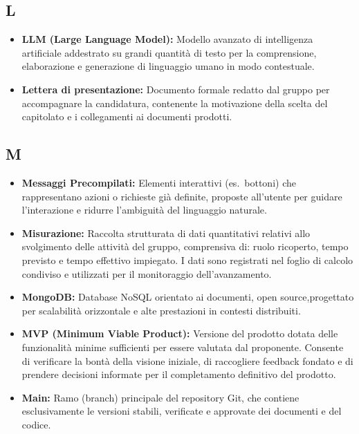 {}
\subsection*{L}
\begin{itemize}[leftmargin=*]
    \item \textbf{LLM (Large Language Model):} Modello avanzato di intelligenza
          artificiale addestrato su grandi quantità di testo per la comprensione,
          elaborazione e generazione di linguaggio umano in modo contestuale.
      \item \textbf{Lettera di presentazione:} Documento formale redatto dal gruppo per accompagnare la candidatura, contenente la motivazione della scelta del capitolato e i collegamenti ai documenti prodotti.
\end{itemize}
 
{}
\subsection*{M}
\begin{itemize}[leftmargin=*]
      \item \textbf{Messaggi Precompilati:} Elementi interattivi (es.\ bottoni) che rappresentano azioni o richieste già definite, proposte all'utente per guidare l'interazione e ridurre l'ambiguità del linguaggio naturale.
      \item \textbf{Misurazione:} Raccolta strutturata di dati quantitativi relativi
          allo svolgimento delle attività del gruppo, comprensiva di: ruolo
          ricoperto, tempo previsto e tempo effettivo impiegato. I dati sono
          registrati nel foglio di calcolo condiviso e utilizzati per il
          monitoraggio dell'avanzamento.
      \item \textbf{MongoDB:} Database NoSQL orientato ai documenti, open source,progettato per scalabilità orizzontale e alte prestazioni in contesti distribuiti.
      \item \textbf{MVP (Minimum Viable Product):} Versione del prodotto dotata delle
          funzionalità minime sufficienti per essere valutata dal proponente.
          Consente di verificare la bontà della visione iniziale, di raccogliere
          feedback fondato e di prendere decisioni informate per il completamento
          definitivo del prodotto.
      \item \textbf{Main:} Ramo (branch) principale del repository Git, che contiene esclusivamente le versioni stabili, verificate e approvate dei documenti e del codice.
\end{itemize}
 
